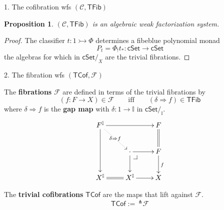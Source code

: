\documentclass[handout]{beamer}
\makeatletter
\newcommand{\myemph}[1]{\textbf{#1}}    %
\newcommand{\cSet}{\ensuremath{\mathsf{cSet}}}
\newcommand{\pbcorner}[1][dr]{\save*!/#1-1.2pc/#1:(-1,1)@^{|-}\restore}
\newcommand{\ra}{\ensuremath{\rightarrow}}
\newcommand{\mono}{\rightarrowtail}
\newcommand{\II}{\mathbb{I}}
\newtheorem{proposition}[theorem]{Proposition}
\theoremstyle{remark}
\makeatother
\begin{document}
\begin{frame}{1. The cofibration wfs $(\mathcal{C},\mathsf{TFib})$}


\begin{proposition}
$(\mathcal{C},\mathsf{TFib})$ is an algebraic weak factorization system.
\end{proposition}

\begin{proof}
The classifier $t : 1 \mono \Phi$ determines a fibeblue polynomial monad
\[
P_t = \Phi_! t_* : \cSet \to \cSet
\] 
the algebras for which in $\cSet/_X$ are the trivial fibrations.
\end{proof}


\end{frame}
\begin{frame}{2. The fibration wfs $(\mathsf{TCof}, \mathcal{F})$ }

The \myemph{fibrations} $\mathcal{F}$ are defined in terms of the trivial fibrations by
\[
 (f : F\rightarrow X) \in \mathcal{F} \qquad\text{iff}\qquad (\delta\!\Rightarrow\!f) \in \mathsf{TFib}
 \]
where $\delta\!\Rightarrow\! f$ is the \myemph{gap map} with $\delta : 1\to\II$ in $\cSet/_\II$.
\[
\xymatrix{
F^\II \ar[dd] \ar@{..>}[rd]|{\delta\Rightarrow f} \ar[rr] && F \ar@{=}[d] \\
& \cdot \ar[d] \ar[r] \pbcorner & F \ar[d]^f \\
X^\II \ar@{=}[r] & X^\II \ar[r]  & X 
}
\]
\pause

The \myemph{trivial cofibrations} $\mathsf{TCof}$ are the maps that lift against  $\mathcal{F}$.
\[
\mathsf{TCof} :=\, ^{\pitchfork}\mathcal{F}
\]

\end{frame}
\end{document}
